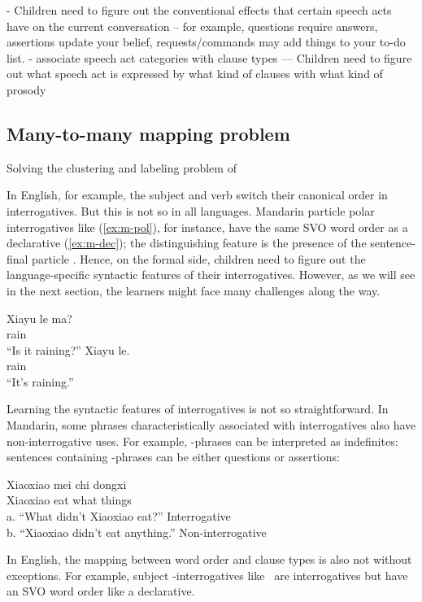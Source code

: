 - Children need to figure out the conventional effects that certain speech acts have on the current conversation
-- for example, questions require answers, assertions update your belief, requests/commands may add things to your to-do list.
- associate speech act categories with clause types
--- Children need to figure out what speech act is expressed by what kind of clauses with what kind of prosody

\subsection{Many-to-many mapping problem}
Solving the clustering and labeling problem of   

In English, for example, the subject and verb switch their canonical order in interrogatives. But this is not so in all languages. Mandarin particle polar interrogatives like (\ref{ex:m-pol}), for instance, have the same SVO word order as a declarative (\ref{ex:m-dec}); the distinguishing feature is the presence of the sentence-final particle . Hence, on the formal side, children need to figure out the language-specific syntactic features of their interrogatives. However, as we will see in the next section, the learners might face many challenges along the way.

\gll Xiayu	le	ma?\\
rain \Asp{} \Sfp{}\\
``Is it raining?''
\eex
{}
\gll Xiayu	le.\\
rain \Asp{}\\
``It's raining.''
\eex

Learning the syntactic features of interrogatives is not so straightforward. In Mandarin, some phrases characteristically associated with interrogatives also have non-interrogative uses. For example, \twh-phrases can be interpreted as indefinites: sentences containing \twh-phrases can be either questions or assertions:

\gll Xiaoxiao mei 	chi 	 dongxi\\ 
Xiaoxiao \Neg{} 	eat	what	things\\
a.	``What didn’t Xiaoxiao eat?''	\hfill Interrogative \twh\\
b.	``Xiaoxiao didn’t eat anything.''		\hfill Non-interrogative \twh
\eex

\noindent In English, the mapping between word order and clause types is also not without exceptions. For example, subject \twh-interrogatives like ~are interrogatives but have an SVO word order like a declarative. 

